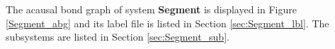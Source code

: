 



   The acausal bond graph of system \textbf{Segment} is
   displayed in Figure \ref{Segment_abg} and its label
   file is listed in Section \ref{sec:Segment_lbl}.
   The subsystems are listed in Section \ref{sec:Segment_sub}.



